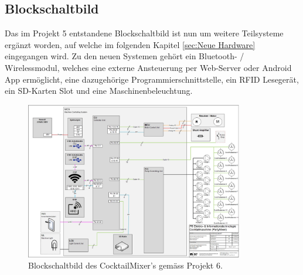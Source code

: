 \subsection{Blockschaltbild}
\label{subsec:Blockschaldbild}

Das im Projekt 5 entstandene Blockschaltbild ist nun um weitere Teilsysteme ergänzt worden, auf welche im folgenden Kapitel \ref{sec:Neue Hardware} eingegangen wird. Zu den neuen Systemen gehört ein Bluetooth- / Wirelessmodul, welches eine externe Ansteuerung per Web-Server oder Android App ermöglicht, eine dazugehörige Programmierschnittstelle, ein RFID Lesegerät, ein SD-Karten Slot und eine Maschinenbeleuchtung.

\begin{figure}[h!]
\center
\includegraphics[angle=90, width = 0.85\textwidth]{graphics/Blockschaltbild}
\caption{Blockschaltbild des CocktailMixer's gemäss Projekt 6.}
\label{fig:Blockschaltbild_Cocktailmixer}
\end{figure}

\newpage


